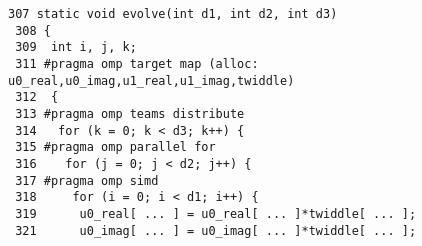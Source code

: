 \hspace{-10pt}
\begin{minipage}{1.1\textwidth}
\begin{lstlisting}[style=customcnonum,basicstyle=\scriptsize, frame=tlrb, caption={\textit{evolve} from NAS/ft.c}, label=nas-ft-1]
 307 static void evolve(int d1, int d2, int d3)
 308 {
 309  int i, j, k;
 311 #pragma omp target map (alloc: u0_real,u0_imag,u1_real,u1_imag,twiddle)
 312  {
 313 #pragma omp teams distribute
 314   for (k = 0; k < d3; k++) {
 315 #pragma omp parallel for
 316    for (j = 0; j < d2; j++) {
 317 #pragma omp simd
 318     for (i = 0; i < d1; i++) {
 319      u0_real[ ... ] = u0_real[ ... ]*twiddle[ ... ];
 321      u0_imag[ ... ] = u0_imag[ ... ]*twiddle[ ... ];
\end{lstlisting}
\end{minipage}  
% 
\vspace{-10pt}
